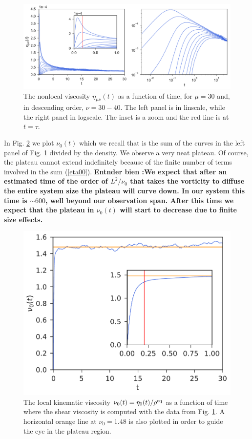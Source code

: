 \documentclass[a4paper,openright,12pt]{book}
\newcommand{\Note}[1]{{\bf \color{red}#1}}    %
\begin{document}
\begin{figure}[h!]
  \centering
\includegraphics[scale=0.45]{Etat-PBC}
\caption[The nonlocal viscosity as a function of time for PBC system]{The nonlocal viscosity $\eta_{\mu\nu}(t)$ as a function of time, for $\mu=30$ and, in descending order, $\nu=30-40$. The left panel is in linscale, while the right panel in logscale. The inset is a zoom and the red line is at $t=\tau$.}
\label{fig:Etat-PBC}
\end{figure}


In Fig.
\ref{fig:KinVisc0t-PBC} we plot $\nu_0(t)$  which we recall that
is the sum  of the curves in  the left panel of Fig. \ref{fig:Etat-PBC} divided by the density. We observe  a very neat
plateau.  Of course, the plateau cannot extend indefinitely because of
the  finite number  of terms  involved  in the  sum (\ref{eta00}).  \Note{ Entnder bien :We
expect that after  an estimated time of the order  of $L^2/\nu_0$ that
takes the vorticity to diffuse the entire system size the plateau will
curve down.  In our system  this time is  $\sim 600$, well  beyond our
observation  span. After  this  time  we expect  that  the plateau  in
$\nu_0(t)$ will start to decrease due to finite size effects.}
\begin{figure}[h!]
  \centering
\includegraphics[scale=0.45]{KinVisc0t-PBC}
\caption[The local kinematic viscosity for PBC system]{The local kinematic viscosity $\nu_0(t)=\eta_0(t)/\rho^{\rm eq}$ as a function of time where the shear viscosity is computed with the data from Fig. \ref{fig:Etat-PBC}. A horizontal orange line at $\nu_0=1.48$ is also plotted in order to guide the eye in the plateau region.}
\label{fig:KinVisc0t-PBC}
\end{figure}
\end{document}
